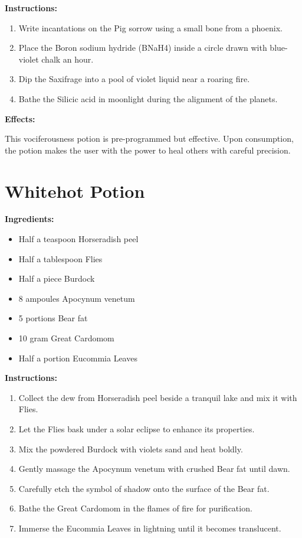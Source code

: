 \documentclass{article}
\begin{document}
\textbf{Instructions:}

\begin{enumerate}
  \item Write incantations on the Pig sorrow using a small bone from a phoenix.
  \item Place the Boron sodium hydride (BNaH4) inside a circle drawn with blue-violet chalk an hour.
  \item Dip the Saxifrage into a pool of violet liquid near a roaring fire.
  \item Bathe the Silicic acid in moonlight during the alignment of the planets.
\end{enumerate}

\textbf{Effects:}

This vociferousness potion is pre-programmed but effective. Upon consumption, the potion makes the user with the power to heal others with careful precision.

\newpage
\section*{Whitehot Potion}

\textbf{Ingredients:}

\begin{itemize}
  \item Half a teaspoon Horseradish peel
  \item Half a tablespoon Flies
  \item Half a piece Burdock
  \item 8 ampoules Apocynum venetum
  \item 5 portions Bear fat
  \item 10 gram Great Cardomom
  \item Half a portion Eucommia Leaves
\end{itemize}

\textbf{Instructions:}

\begin{enumerate}
  \item Collect the dew from Horseradish peel beside a tranquil lake and mix it with Flies.
  \item Let the Flies bask under a solar eclipse to enhance its properties.
  \item Mix the powdered Burdock with violets sand and heat boldly.
  \item Gently massage the Apocynum venetum with crushed Bear fat until dawn.
  \item Carefully etch the symbol of shadow onto the surface of the Bear fat.
  \item Bathe the Great Cardomom in the flames of fire for purification.
  \item Immerse the Eucommia Leaves in lightning until it becomes translucent.
\end{enumerate}
\end{document}
